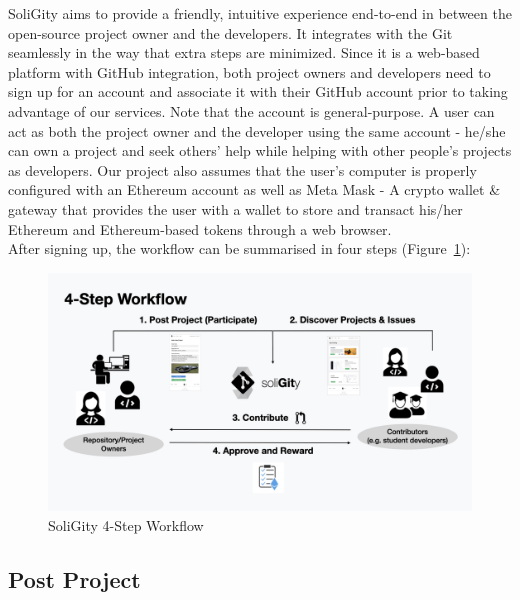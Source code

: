 \documentclass[12pt]{article}
\renewcommand{\_}{\kern-1.5pt\textunderscore\kern-1.5pt}
\begin{document}
SoliGity aims to provide a friendly, intuitive experience end-to-end in between the open-source project owner
and the developers. It integrates with the Git seamlessly in the way that extra steps are minimized. Since it
is a web-based platform with GitHub integration, both project owners and developers need to sign up for an
account and associate it with their GitHub account prior to taking advantage of our services. Note that the
account is general-purpose. A user can act as both the project owner and the developer using the same account
- he/she can own a project and seek others’ help while helping with other people’s projects as developers.
Our project also assumes that the user’s computer is properly configured with an Ethereum account as well as
Meta Mask - A crypto wallet \& gateway that provides the user with a wallet to store and transact his/her
Ethereum and Ethereum-based tokens through a web browser. \\

\noindent After signing up, the workflow can be summarised in four steps (Figure~\ref{fig:workflow1}):

\begin{figure}[H]
	\centering
	\includegraphics[width=13.5cm]{graphs/00a. workflow.jpeg}
	\caption{SoliGity 4-Step Workflow}
	\label{fig:workflow1}
\end{figure}



\renewcommand\thesubsection{Step \arabic{subsection}.}
\renewcommand\thesubsubsection{\arabic{subsubsection}.}

\subsection{Post Project}
\end{document}
